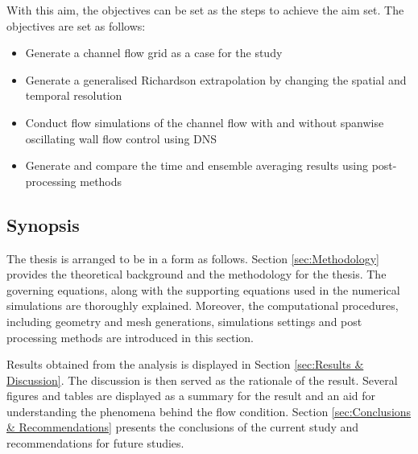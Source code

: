 With this aim, the objectives can be set as the steps to achieve the aim set. The objectives are set as follows:
\begin{itemize}[noitemsep]
    \item Generate a channel flow grid as a case for the study
    \item Generate a generalised Richardson extrapolation by changing the spatial and temporal resolution
    \item Conduct flow simulations of the channel flow with and without spanwise oscillating wall flow control using DNS
    \item Generate and compare the time and ensemble averaging results using post-processing methods

\end{itemize}



\subsection{Synopsis}
\label{sec:Sinopsis}
The thesis is arranged to be in a form as follows. Section \ref{sec:Methodology} provides the theoretical background and the methodology for the thesis. The governing equations, along with the supporting equations used in the numerical simulations are thoroughly explained. Moreover, the computational procedures, including geometry and mesh generations, simulations settings and post processing methods are introduced in this section.

Results obtained from the analysis is displayed in Section \ref{sec:Results & Discussion}. The discussion is then served as the rationale of the result. Several figures and tables are displayed as a summary for the result and an aid for understanding the phenomena behind the flow condition. Section \ref{sec:Conclusions & Recommendations} presents the conclusions of the current study and recommendations for future studies.
